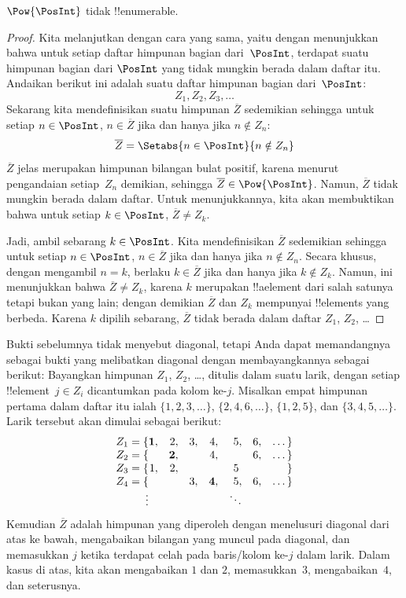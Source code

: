 \documentclass[../../../include/open-logic-section]{subfiles}
\begin{document}
\begin{thm}
$\Pow{\PosInt}$ tidak !!{enumerable}.
\end{thm}

\begin{proof}
Kita melanjutkan dengan cara yang sama, yaitu dengan menunjukkan bahwa untuk
setiap daftar himpunan bagian dari~$\PosInt$, terdapat suatu himpunan bagian
dari $\PosInt$ yang tidak mungkin berada dalam daftar itu. Andaikan berikut
ini adalah suatu daftar himpunan bagian dari~$\PosInt$:
\[
Z_{1}, Z_{2}, Z_{3}, \dots
\]
Sekarang kita mendefinisikan suatu himpunan $\overline{Z}$ sedemikian sehingga
untuk setiap $n \in \PosInt$, $n \in \overline{Z}$ jika dan hanya jika $n
\notin Z_{n}$:
\[
\overline{Z} = \Setabs{n \in \PosInt}{n \notin Z_n}
\]
$\overline{Z}$ jelas merupakan himpunan bilangan bulat positif, karena menurut
pengandaian setiap~$Z_n$ demikian, sehingga $\overline{Z} \in
\Pow{\PosInt}$. Namun, $\overline{Z}$ tidak mungkin berada dalam daftar. Untuk
menunjukkannya, kita akan membuktikan bahwa untuk setiap $k \in \PosInt$,
$\overline{Z} \neq Z_k$.

Jadi, ambil sebarang $k \in \PosInt$. Kita mendefinisikan $\overline{Z}$
sedemikian sehingga untuk setiap $n \in \PosInt$, $n \in \overline{Z}$ jika
dan hanya jika $n \notin Z_n$. Secara khusus, dengan mengambil $n=k$, berlaku
$k \in \overline{Z}$ jika dan hanya jika $k \notin Z_k$. Namun, ini
menunjukkan bahwa $\overline{Z} \neq Z_k$, karena $k$ merupakan !!a{element}
dari salah satunya tetapi bukan yang lain; dengan demikian $\overline{Z}$ dan
$Z_k$ mempunyai !!{element}s yang berbeda. Karena $k$ dipilih sebarang,
$\overline{Z}$ tidak berada dalam daftar $Z_1$, $Z_2$, \dots
\end{proof}

\begin{explain}
Bukti sebelumnya tidak menyebut diagonal, tetapi Anda dapat memandangnya
sebagai bukti yang melibatkan diagonal dengan membayangkannya sebagai berikut:
Bayangkan himpunan $Z_1$, $Z_2$, \dots, ditulis dalam suatu larik, dengan
setiap !!{element}~$j \in Z_i$ dicantumkan pada kolom ke-$j$. Misalkan empat
himpunan pertama dalam daftar itu ialah $\{1,2,3,\dots\}$, $\{2, 4, 6,
\dots\}$, $\{1,2,5\}$, dan $\{3,4,5,\dots\}$. Larik tersebut akan dimulai
sebagai berikut:
\[
\begin{array}{r@{}rrrrrrr}
  Z_1 = \{ & \mathbf{1}, & 2, & 3, & 4, & 5, & 6, & \dots\}\\
  Z_2 = \{ &  & \mathbf{2}, &  & 4, &  & 6, & \dots\}\\
  Z_3 = \{ & 1, & 2, &  &  & 5\phantom{,} &  & \}\\
  Z_4 = \{ &  &  & 3, & \mathbf{4}, & 5, & 6, & \dots\}\\
  \vdots & & & & & \ddots
\end{array}
\]
Kemudian $\overline{Z}$ adalah himpunan yang diperoleh dengan menelusuri
diagonal dari atas ke bawah, mengabaikan bilangan yang muncul pada diagonal,
dan memasukkan $j$ ketika terdapat celah pada baris/kolom ke-$j$ dalam larik.
Dalam kasus di atas, kita akan mengabaikan $1$ dan $2$, memasukkan~$3$,
mengabaikan~$4$, dan seterusnya.
\end{explain}
\end{document}
